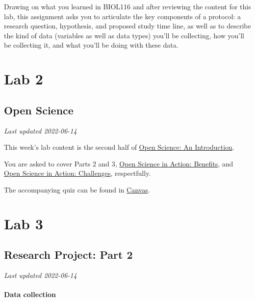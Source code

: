 \documentclass[
]{book}
\begin{document}
Drawing on what you learned in BIOL116 and after reviewing the content for this lab, this assignment asks you to articulate the key components of a protocol: a research question, hypothesis, and proposed study time line, as well as to describe the kind of data (variables as well as data types) you'll be collecting, how you'll be collecting it, and what you'll be doing with these data.

\hypertarget{part-lab-2}{%
\part*{Lab 2}\label{part-lab-2}}

\hypertarget{open-science}{%
\chapter*{Open Science}\label{open-science}}

\emph{Last updated 2022-06-14}

This week's lab content is the second half of \href{https://ubco-biology.github.io/OS-Introduction/}{Open Science: An Introduction}.

You are asked to cover Parts 2 and 3, \href{https://ubco-biology.github.io/OS-Introduction/open-science-in-action-benefits.html}{Open Science in Action: Benefits}, and \href{https://ubco-biology.github.io/OS-Introduction/open-science-in-action-challenges.html}{Open Science in Action: Challenges}, respectfully.

The accompanying quiz can be found in \href{https://canvas.ubc.ca/courses/90147}{Canvas}.

\hypertarget{part-lab-3}{%
\part*{Lab 3}\label{part-lab-3}}

\hypertarget{research-project-part-2}{%
\chapter*{Research Project: Part 2}\label{research-project-part-2}}

\emph{Last updated 2022-06-14}

\hypertarget{data-collection}{%
\subsection*{Data collection}\label{data-collection}}
\end{document}
